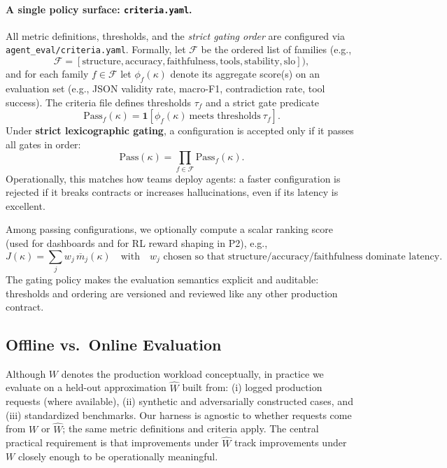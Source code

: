 \paragraph{A single policy surface: \texttt{criteria.yaml}.}
All metric definitions, thresholds, and the \emph{strict gating order} are configured via \texttt{agent\_eval/criteria.yaml}.
Formally, let $\mathcal{F}$ be the ordered list of families (e.g.,
\[
\mathcal{F}=[\text{structure},\text{accuracy},\text{faithfulness},\text{tools},\text{stability},\text{slo}]),
\]
and for each family $f\in\mathcal{F}$ let $\phi_f(\kappa)$ denote its aggregate score(s) on an evaluation set (e.g., JSON validity rate, macro-F1, contradiction rate, tool success).
The criteria file defines thresholds $\tau_f$ and a strict gate predicate
\[
\mathrm{Pass}_f(\kappa)=\mathbf{1}\!\left[\phi_f(\kappa)\ \text{meets thresholds}\ \tau_f\right].
\]
Under \textbf{strict lexicographic gating}, a configuration is accepted only if it passes all gates in order:
\[
\mathrm{Pass}(\kappa)=\prod_{f\in\mathcal{F}}\mathrm{Pass}_f(\kappa).
\]
Operationally, this matches how teams deploy agents: a faster configuration is rejected if it breaks contracts or increases hallucinations, even if its latency is excellent.

Among passing configurations, we optionally compute a scalar ranking score (used for dashboards and for RL reward shaping in P2), e.g.,
\[
J(\kappa)=\sum_{j} w_j \,\overline{m}_j(\kappa)
\quad\text{with}\quad w_j \text{ chosen so that structure/accuracy/faithfulness dominate latency.}
\]
The gating policy makes the evaluation semantics explicit and auditable: thresholds and ordering are versioned and reviewed like any other production contract.

\subsection{Offline vs.\ Online Evaluation}

Although $W$ denotes the production workload conceptually, in practice we evaluate on a held-out approximation $\widehat{W}$ built from:
(i) logged production requests (where available),
(ii) synthetic and adversarially constructed cases, and
(iii) standardized benchmarks.
Our harness is agnostic to whether requests come from $W$ or $\widehat{W}$; the same metric definitions and criteria apply.
The central practical requirement is that improvements under $\widehat{W}$ track improvements under $W$ closely enough to be operationally meaningful.

